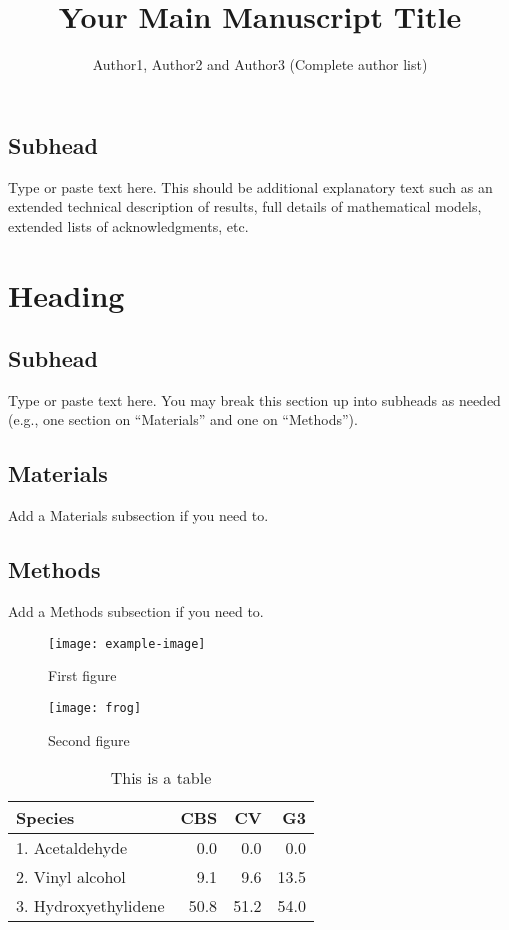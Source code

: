 \documentclass[9pt,twoside,lineno]{pnas-new}
\title{Your Main Manuscript Title}
\author{Author1, Author2 and Author3 (Complete author list)}
\begin{document}

\maketitle

\SItext


\subsection*{Subhead}
Type or paste text here. This should be additional explanatory text such as an extended technical description of results, full details of mathematical models, extended lists of acknowledgments, etc.

\section*{Heading}
\subsection*{Subhead}
Type or paste text here. You may break this section up into subheads as needed (e.g., one section on ``Materials'' and one on ``Methods'').

\subsection*{Materials}
Add a Materials subsection if you need to.

\subsection*{Methods}
Add a Methods subsection if you need to.


\begin{figure}
\centering
\texttt{[image: example-image]}
\caption{First figure}
\end{figure}

\begin{figure}
\centering
\texttt{[image: frog]}
\caption{Second figure}
\end{figure}

\begin{table}\centering
\caption{This is a table}

\begin{tabular}{lrrr}
Species & CBS & CV & G3 \\
\midrule
1. Acetaldehyde & 0.0 & 0.0 & 0.0 \\
2. Vinyl alcohol & 9.1 & 9.6 & 13.5 \\
3. Hydroxyethylidene & 50.8 & 51.2 & 54.0\\
\bottomrule
\end{tabular}
\end{table}
\end{document}
